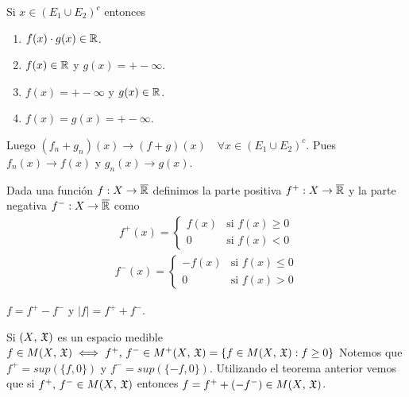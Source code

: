 Si \(x \in (E_1 \cup E_2)^c\) entonces \begin{enumerate}
    \item \(f(x) \cdot g(x) \in \mathbb{R}\).
    \item \(f(x) \in \mathbb{R}\) y \(g(x) = +-\infty\).
    \item \(f(x) = +-\infty\) y \(g(x) \in \mathbb{R}\).
    \item \(f(x) = g(x) = +-\infty\).
\end{enumerate}

Luego \((f_n + g_n)(x) \to (f+g)(x) \quad \forall x \in (E_1 \cup E_2)^c\). Pues \(f_n(x) \to f(x)\) y \(g_n(x) \to g(x)\).

\clearpage

\begin{definition}
    Dada una función \(f : X \to \overline{\mathbb{R}}\) definimos la parte positiva \(f^{+} : X \to \overline{\mathbb{R}}\) y la parte negativa \(f^{-} : X \to \overline{\mathbb{R}}\) como
    \begin{align*}
        f^{+}(x) = \begin{cases}
                       f(x) & \text{si } f(x) \geq 0 \\
                       0    & \text{si } f(x) < 0
                   \end{cases}
    \end{align*}
    \begin{align*}
        f^{-}(x) = \begin{cases}
                       -f(x) & \text{si } f(x) \leq 0 \\
                       0     & \text{si } f(x) > 0
                   \end{cases}
    \end{align*}
\end{definition}

\begin{note}
    \(f = f^{+} - f^{-}\) y \(|f| = f^{+} + f^{-}\).
\end{note}

\begin{note}
    Si \((X \text{, } \mathfrak{X})\) es un espacio medible \(f \in M(X\text{, } \mathfrak{X}) \iff f^{+} \text{, } f^{-} \in M^{+}(X\text{, } \mathfrak{X}) = \{ f \in M(X\text{, } \mathfrak{X}) : f \geq 0 \}\)
    Notemos que \(f^{+} = sup(\{ f, 0 \})\) y \(f^{-} = sup(\{ -f, 0 \})\).
    Utilizando el teorema anterior vemos que si \(f^{+} \text{, } f^{-} \in M(X\text{, } \mathfrak{X})\) entonces \(f = f^{+} + (-f^{-}) \in M(X\text{, } \mathfrak{X})\).
\end{note}

